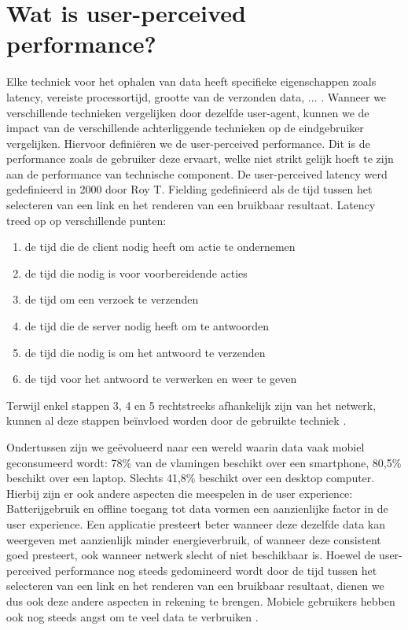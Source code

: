 \section{Wat is user-perceived performance?}
\label{sec:what_is_user_perceived_performance}
Elke techniek voor het ophalen van data heeft specifieke eigenschappen zoals latency, vereiste processortijd, grootte van de verzonden data, ... . Wanneer we verschillende technieken vergelijken door dezelfde user-agent, kunnen we de impact van de verschillende achterliggende technieken op de eindgebruiker vergelijken. Hiervoor definiëren we de user-perceived performance. Dit is de performance zoals de gebruiker deze ervaart, welke niet strikt gelijk hoeft te zijn aan de performance van technische component. De user-perceived latency werd gedefinieerd in 2000 door Roy T. Fielding gedefinieerd als de tijd tussen het selecteren van een link en het renderen van een bruikbaar resultaat\citep{fielding99}. Latency treed op op verschillende punten: 
\begin{enumerate}
	\item de tijd die de client nodig heeft om actie te ondernemen 
	\item de tijd die nodig is voor voorbereidende acties
	\item de tijd om een verzoek te verzenden
	\item de tijd die de server nodig heeft om te antwoorden
	\item de tijd die nodig is om het antwoord te verzenden
	\item de tijd voor het antwoord te verwerken en weer te geven
\end{enumerate}
Terwijl enkel stappen 3, 4 en 5 rechtstreeks afhankelijk zijn van het netwerk, kunnen al deze stappen beïnvloed worden door de gebruikte techniek \citep{fielding99}.

Ondertussen zijn we geëvolueerd naar een wereld waarin data vaak mobiel geconsumeerd wordt: 78\% van de vlamingen beschikt over een smartphone, 80,5\% beschikt over een laptop. Slechts 41,8\% beschikt over een desktop computer\citep{digimeter17}. Hierbij zijn er ook andere aspecten die meespelen in de user experience: Batterijgebruik en offline toegang tot data vormen een aanzienlijke factor in de user experience. Een applicatie presteert beter wanneer deze dezelfde data kan weergeven met aanzienlijk minder energieverbruik, of wanneer deze consistent goed presteert, ook wanneer netwerk slecht of niet beschikbaar is. Hoewel de user-perceived performance nog steeds gedomineerd wordt door de tijd tussen het selecteren van een link en het renderen van een bruikbaar resultaat, dienen we dus ook deze andere aspecten in rekening te brengen. Mobiele gebruikers hebben ook nog steeds angst om te veel data te verbruiken \citep{ammelrooy17}.

